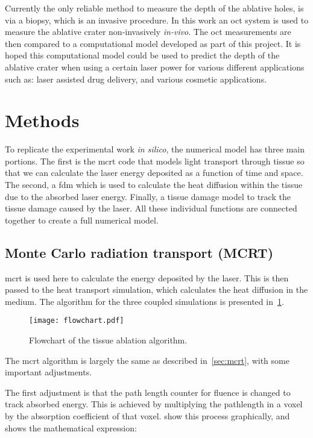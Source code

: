 Currently the only reliable method to measure the depth of the ablative holes, is via a biopsy, which is an invasive procedure. In this work an \gls*{oct} system is used to measure the ablative crater non-invasively \textit{in-vivo}. The \gls*{oct} measurements are then compared to a computational model developed as part of this project. It is hoped this computational model could be used to predict the depth of the ablative crater when using a certain laser power for various different applications such as: laser assisted drug delivery, and various cosmetic applications.



\section{Methods}

To replicate the experimental work \textit{in silico}, the numerical model has three main portions. The first is the \gls*{mcrt} code that models light transport through tissue so that we can calculate the laser energy deposited as a function of time and space. The second, a \gls*{fdm} which is used to calculate the heat diffusion within the tissue due to the absorbed laser energy. Finally, a tissue damage model to track the tissue damage caused by the laser. All these individual functions are connected together to create a full numerical model.

\subsection{Monte Carlo radiation transport (MCRT)}

\gls*{mcrt} is used here to calculate the energy deposited by the laser. This is then passed to the heat transport simulation, which calculates the heat diffusion in the medium. The algorithm for the three coupled simulations is presented in~\cref{fig:algoablation}.

\begin{figure}[!ht]
\centering
\texttt{[image: flowchart.pdf]}
\caption{Flowchart of the tissue ablation algorithm.}
\label{fig:algoablation}
\end{figure}

The \gls*{mcrt} algorithm is largely the same as described in~\cref{sec:mcrt}, with some important adjustments.

The first adjustment is that the path length counter for fluence is changed to track absorbed energy. This is achieved by multiplying the pathlength in a voxel by the absorption coefficient of that voxel.  show this process graphically, and  shows the mathematical expression:

